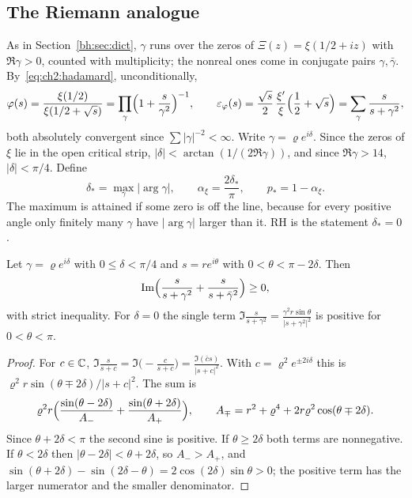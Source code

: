 \subsection{The Riemann analogue}\label{bs:sec:xi}

As in Section~\ref{bh:sec:dict}, $\gamma$ runs over the zeros of $\Xi(z)=\xi(1/2+iz)$ with $\Re\gamma>0$, counted with multiplicity; the nonreal ones come in conjugate pairs $\gamma,\bar\gamma$. By~\eqref{eq:ch2:hadamard}, unconditionally,
\[
\varphi(s)=\frac{\xi(1/2)}{\xi(1/2+\sqrt s)}=\prod_\gamma\Bigl(1+\frac s{\gamma^2}\Bigr)^{-1},\qquad
\varepsilon_\varphi(s)=\frac{\sqrt s}{2}\,\frac{\xi'}{\xi}\Bigl(\frac12+\sqrt s\Bigr)=\sum_\gamma\frac{s}{s+\gamma^2},
\]
both absolutely convergent since $\sum|\gamma|^{-2}<\infty$. Write $\gamma=\varrho e^{i\delta}$. Since the zeros of $\xi$ lie in the open critical strip, $|\delta|<\arctan(1/(2\Re\gamma))$, and since $\Re\gamma>14$, $|\delta|<\pi/4$. Define
\[
\delta_*=\max_\gamma|\arg\gamma|,\qquad \alpha_\xi=\frac{2\delta_*}{\pi},\qquad p_*=1-\alpha_\xi.
\]
The maximum is attained if some zero is off the line, because for every positive angle only finitely many $\gamma$ have $|\arg\gamma|$ larger than it. RH is the statement $\delta_*=0$.

\begin{lemma}\label{bs:lem:pair}
Let $\gamma=\varrho e^{i\delta}$ with $0\le\delta<\pi/4$ and $s=re^{i\theta}$ with $0<\theta<\pi-2\delta$. Then
\[
\Im\Bigl(\frac{s}{s+\gamma^2}+\frac{s}{s+\bar\gamma^2}\Bigr)\ge0,
\]
with strict inequality. For $\delta=0$ the single term $\Im\frac{s}{s+\gamma^2}=\frac{\gamma^2r\sin\theta}{|s+\gamma^2|^2}$ is positive for $0<\theta<\pi$.
\end{lemma}

\begin{proof}
For $c\in\C$, $\Im\frac{s}{s+c}=\Im\bigl(-\frac{c}{s+c}\bigr)=\frac{\Im(\bar c s)}{|s+c|^2}$. With $c=\varrho^2e^{\pm2i\delta}$ this is $\varrho^2r\sin(\theta\mp2\delta)/|s+c|^2$. The sum is
\[
\varrho^2r\Bigl(\frac{\sin(\theta-2\delta)}{A_-}+\frac{\sin(\theta+2\delta)}{A_+}\Bigr),\qquad A_\mp=r^2+\varrho^4+2r\varrho^2\cos(\theta\mp2\delta).
\]
Since $\theta+2\delta<\pi$ the second sine is positive. If $\theta\ge2\delta$ both terms are nonnegative. If $\theta<2\delta$ then $|\theta-2\delta|<\theta+2\delta$, so $A_->A_+$, and $\sin(\theta+2\delta)-\sin(2\delta-\theta)=2\cos(2\delta)\sin\theta>0$; the positive term has the larger numerator and the smaller denominator.
\end{proof}

